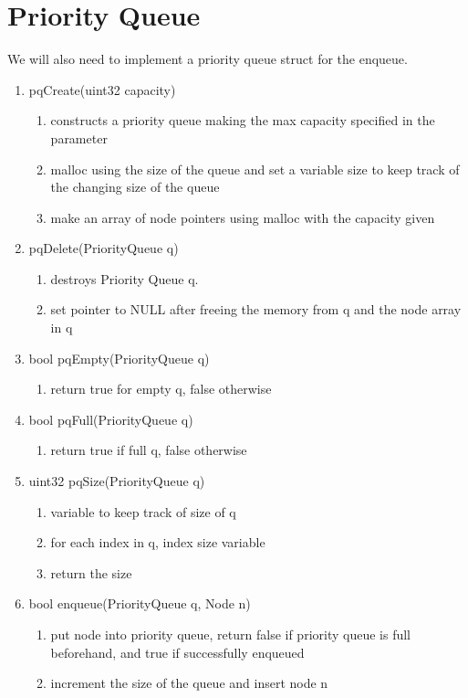 \documentclass[11pt]{article}
\begin{document}
\section{Priority Queue}\label{ss:Prio}
We will also need to implement a priority queue struct for the enqueue.
\begin{enumerate}
\item pqCreate(uint32 capacity)
	\begin{enumerate}
	\item constructs a priority queue making the max capacity specified in the parameter
	\item malloc using the size of the queue and set a variable size to keep track of the changing size of the queue
	\item make an array of node pointers using malloc with the capacity given
	\end{enumerate}
\item pqDelete(PriorityQueue q)
	\begin{enumerate}
	\item destroys Priority Queue q.
	\item set pointer to NULL after freeing the memory from q and the node array in q
	\end{enumerate}
\item bool pqEmpty(PriorityQueue q)
	\begin{enumerate}
	\item return true for empty q, false otherwise
	\end{enumerate}
\item bool pqFull(PriorityQueue q)
	\begin{enumerate}
	\item return true if full q, false otherwise
	\end{enumerate}
\item uint32 pqSize(PriorityQueue q)
	\begin{enumerate}
	\item variable to keep track of size of q
	\item for each index in q, index size variable
	\item return the size
	\end{enumerate}
\item bool enqueue(PriorityQueue q, Node n)
	\begin{enumerate}
	\item put node into priority queue, return false if priority queue is full beforehand, and true if successfully enqueued
	\item increment the size of the queue and insert node n

\end{enumerate}
\end{enumerate}
\end{document}
